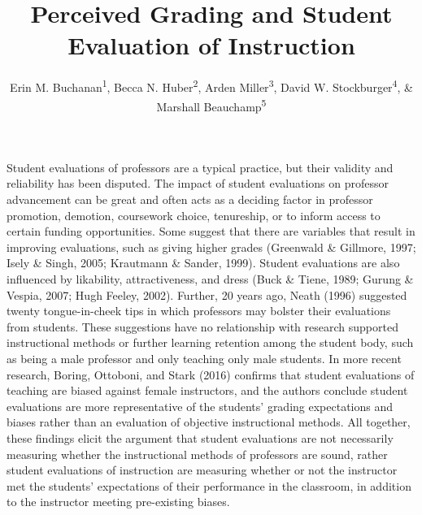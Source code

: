 \documentclass[,man,mask]{apa6}
\title{Perceived Grading and Student Evaluation of Instruction}
\author{Erin M. Buchanan\textsuperscript{1}, Becca N. Huber\textsuperscript{2}, Arden Miller\textsuperscript{3}, David W. Stockburger\textsuperscript{4}, \& Marshall Beauchamp\textsuperscript{5}}
\date{}
\affiliation{
\vspace{0.5cm}
\textsuperscript{1} Harrisburg University of Science and Technology\\\textsuperscript{2} Idaho State University\\\textsuperscript{3} Missouri State University\\\textsuperscript{4} US Air Force Academy\\\textsuperscript{5} University of Missouri - Kansas City}
\begin{document}
\maketitle

Student evaluations of professors are a typical practice, but their validity and reliability has been disputed. The impact of student evaluations on professor advancement can be great and often acts as a deciding factor in professor promotion, demotion, coursework choice, tenureship, or to inform access to certain funding opportunities. Some suggest that there are variables that result in improving evaluations, such as giving higher grades (Greenwald \& Gillmore, 1997; Isely \& Singh, 2005; Krautmann \& Sander, 1999). Student evaluations are also influenced by likability, attractiveness, and dress (Buck \& Tiene, 1989; Gurung \& Vespia, 2007; Hugh Feeley, 2002). Further, 20 years ago, Neath (1996) suggested twenty tongue-in-cheek tips in which professors may bolster their evaluations from students. These suggestions have no relationship with research supported instructional methods or further learning retention among the student body, such as being a male professor and only teaching only male students. In more recent research, Boring, Ottoboni, and Stark (2016) confirms that student evaluations of teaching are biased against female instructors, and the authors conclude student evaluations are more representative of the students' grading expectations and biases rather than an evaluation of objective instructional methods. All together, these findings elicit the argument that student evaluations are not necessarily measuring whether the instructional methods of professors are sound, rather student evaluations of instruction are measuring whether or not the instructor met the students' expectations of their performance in the classroom, in addition to the instructor meeting pre-existing biases.
\end{document}
